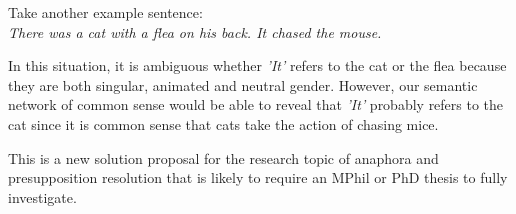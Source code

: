 Take another example sentence:\\
\textit{There was a cat with a flea on his back. It chased the mouse.}

In this situation, it is ambiguous whether \textit{'It'} refers to the cat or the flea because they are both singular, animated and neutral gender. However, our semantic network of common sense would be able to reveal that \textit{'It'} probably refers to the cat since it is common sense that cats take the action of chasing mice.

This is a new solution proposal for the research topic of anaphora and presupposition resolution that is likely to require an MPhil or PhD thesis to fully investigate.



